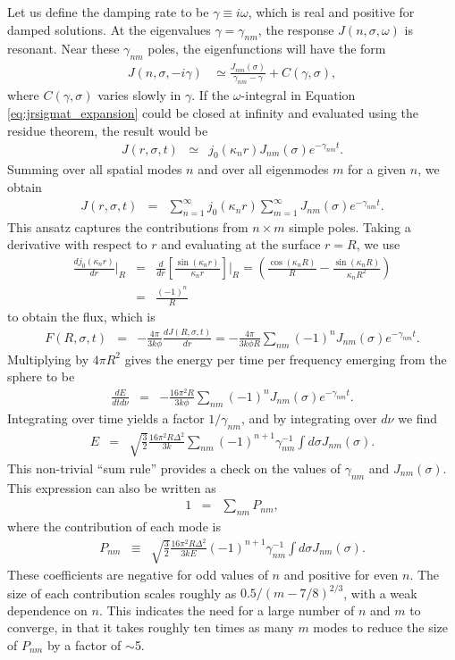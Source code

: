 \documentclass[linenumbers]{aastex63}
\newcommand{\be}{\begin{eqnarray}}
\newcommand{\ee}{\end{eqnarray}}
\begin{document}
Let us define the damping rate to be $\gamma \equiv i\omega$, which is real and positive for damped solutions. At the eigenvalues $\gamma=\gamma_{nm}$, the response $J(n, \sigma, \omega)$ is resonant. Near these $\gamma_{nm}$ poles, the eigenfunctions will have the form 
\be \label{eq:jnsigmaomega_approx}
J(n,\sigma,-i\gamma) & \simeq \frac{ J_{nm}(\sigma) }{\gamma_{nm} - \gamma} + C(\gamma, \sigma),
\ee
where $C(\gamma, \sigma)$ varies slowly in $\gamma$. If the $\omega$-integral in Equation \ref{eq:jrsigmat_expansion} could be closed at infinity and evaluated using the residue theorem, the result would be
\be
J(r,\sigma,t) & \simeq & j_0(\kappa_n r) J_{nm}(\sigma) e^{-\gamma_{nm}t}.
\ee
Summing over all spatial modes $n$ and over all eigenmodes $m$ for a given $n$, we obtain
\be \label{eq:Jrsigmat}
J(r,\sigma,t) & = & \sum_{n=1}^\infty j_0(\kappa_n r)  \sum_{m=1}^{\infty} J_{nm}(\sigma) e^{-\gamma_{nm}t}.
\ee
This ansatz captures the contributions from $n \times m$ simple poles. Taking a derivative with respect to $r$ and evaluating at the surface $r=R$, we use
\be
\frac{dj_0(\kappa_n r)}{dr} \bigg\rvert_R & =& \frac{d}{dr} \left[ \frac{\sin(\kappa_n r)}{\kappa_n r} \right]\bigg\rvert_R
=  \left( \frac{\cos(\kappa_n R)}{R} - \frac{\sin(\kappa_n R)}{\kappa_n R^2} \right)
\nonumber \\ & = & \frac{(-1)^n}{R}
\ee
to obtain the flux, which is
\be
F(R,\sigma,t) & =& - \frac{4\pi}{3k\phi} \frac{dJ(R,\sigma,t)}{dr} 
= - \frac{4\pi}{3k\phi R}  \sum_{nm} (-1)^n J_{nm}(\sigma) e^{-\gamma_{nm}t}.
\ee
Multiplying by $4\pi R^2$ gives the energy per time per frequency emerging from the sphere to be
\be
\frac{dE}{dtd\nu} & = & - \frac{16\pi^2 R}{3k\phi}  \sum_{nm} (-1)^n J_{nm}(\sigma) e^{-\gamma_{nm}t}.
\label{eq:dEdtdnu}
\ee
Integrating over time yields a factor $1/\gamma_{nm}$, and by integrating over $d\nu$ we find
\be \label{eq:sum_rule}
E & = &  \sqrt{ \frac{3}{2} } \frac{16\pi^2R\Delta^2}{3k} \sum_{nm} (-1)^{n+1} \gamma_{nm}^{-1} \int d\sigma J_{nm}(\sigma).
\ee
This non-trivial ``sum rule'' provides a check on the values of $\gamma_{nm}$ and $J_{nm}(\sigma)$. This expression can also be written as
\be
1 & =& \sum_{nm} P_{nm},
\label{eq:sumrule}
\ee
where the contribution of each mode is
\be \label{eq:pnmsoln}
P_{nm} & \equiv & \sqrt{ \frac{3}{2} } \frac{16\pi^2R\Delta^2}{3kE}  (-1)^{n+1} \gamma_{nm}^{-1} \int d\sigma J_{nm}(\sigma).
\ee
These coefficients are negative for odd values of $n$ and positive for even $n$. The size of each contribution scales roughly as $0.5/(m-7/8)^{2/3}$, with a weak dependence on $n$. This indicates the need for a large number of $n$ and $m$ to converge, in that it takes roughly ten times as many $m$ modes to reduce the size of $P_{nm}$ by a factor of ${\sim}$5. 
\end{document}
